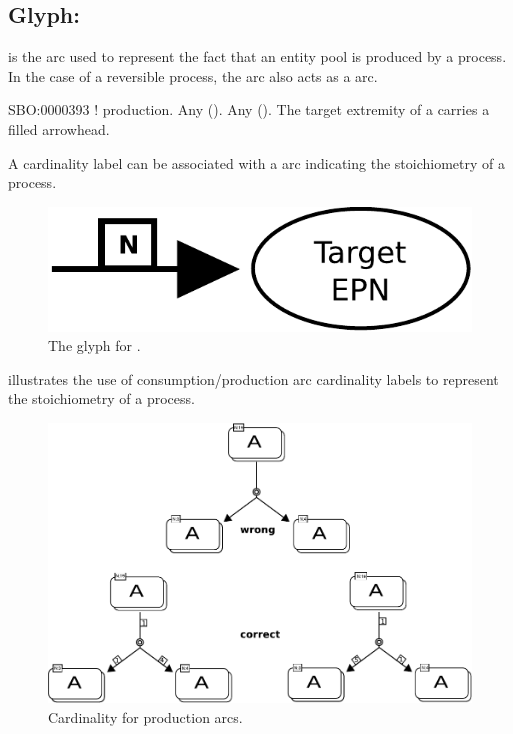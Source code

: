 

\subsection{Glyph: }\label{sec:production}

 is the arc used to represent the fact that an entity pool is 
produced by a process. In the case of a reversible process, the 
 arc also acts as a  arc.

\begin{glyphDescription}
 \glyphSboTerm SBO:0000393 ! production.
 \glyphOrigin Any  ().
 \glyphTarget Any  ().
 \glyphEndPoint The target extremity of a  carries a filled arrowhead.
 \end{glyphDescription}

A cardinality label can be associated with a  arc indicating the stoichiometry of a process.

\begin{figure}[H]
  \centering
  \includegraphics[scale = 0.4]{images/production}
  \caption{The \PD glyph for .}
  \label{fig:production}
\end{figure}

 illustrates the use of consumption/production arc cardinality labels to represent the stoichiometry of a process.

\begin{figure}[H]
  \centering
  \includegraphics[scale = 0.85]{examples/stoichEx1}
  \caption{Cardinality for production arcs.}
  \label{fig:prod-card}
\end{figure}





